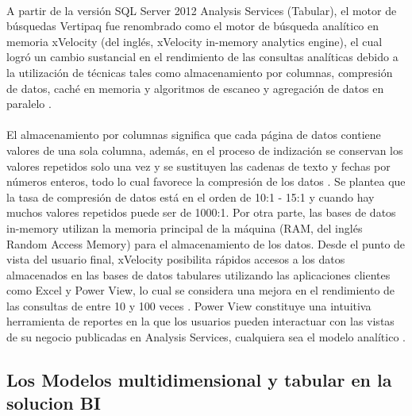 \documentclass[preprint,12pt]{elsarticle}
\begin{document}
\\
A partir de la versión SQL Server 2012 Analysis Services (Tabular), el motor de búsquedas Vertipaq fue renombrado como el motor de búsqueda analítico en memoria xVelocity (del inglés, xVelocity in-memory analytics engine), el cual logró un cambio sustancial en el rendimiento de las consultas analíticas debido a la  utilización  de  técnicas  tales  como almacenamiento  por  columnas,  compresión  de  datos,  caché  en memoria  y  algoritmos  de  escaneo  y  agregación  de  datos  en  paralelo . \\
\\
El  almacenamiento  por columnas significa que cada página de datos contiene valores de una sola columna, además, en el proceso de indización se conservan los valores repetidos solo una vez y se sustituyen las cadenas de texto y fechas por números enteros, todo  lo cual  favorece la  compresión de  los datos  . Se  plantea que  la tasa  de compresión de datos está en el orden de 10:1 - 15:1 y cuando hay muchos valores repetidos puede ser de 1000:1. Por otra parte, las bases de datos in-memory utilizan la memoria principal de la máquina (RAM, del inglés  Random Access  Memory) para el almacenamiento  de los datos. Desde  el punto de vista  del usuario final, xVelocity posibilita rápidos accesos a los datos almacenados en las bases de datos tabulares utilizando  las aplicaciones  clientes como  Excel y  Power View,  lo cual se  considera  una  mejora  en el rendimiento  de  las  consultas  de  entre  10  y  100  veces  .  Power  View  constituye  una  intuitiva herramienta de reportes en la que los usuarios pueden interactuar con las vistas de su negocio publicadas en Analysis Services, cualquiera sea el modelo analítico .



\subsection{Los Modelos multidimensional y tabular en la solucion BI}
\end{document}
